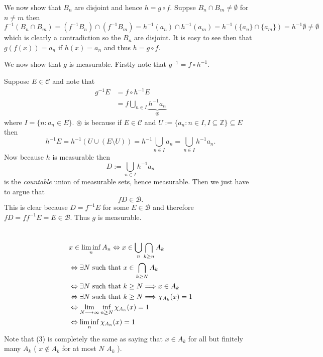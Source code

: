 \documentclass{unswmaths}
\begin{document}
We now show that $ B_n $ are disjoint and hence $ h = g \circ f $. Suppse $ B_n \cap B_m \neq \emptyset $ for $ n \neq m $ then 
$$ f^{-1} (B_n \cap B_m) = (f^{-1} B_n) \cap (f^{-1} B_m) = h^{-1}(a_n) \cap h^{-1}(a_m) = h^{-1}( \{a_n\} \cap \{a_m\} ) = h^{-1} \emptyset \neq \emptyset $$
which is clearly a contradiction so the $ B_n $ are disjoint. It is easy to see then that $ g(f(x)) = a_n $ if $ h(x) = a_n $ and thus $ h = g \circ f $.

We now show that $ g $ is measurable. Firstly note that $ g^{-1} = f \circ h^{-1} $.

Suppose $ E \in \mathcal{C} $ and note that
\begin{align*}
g^{-1}E &= f \circ h^{-1} E \\
&= f \bigcup_{n \in I} \underbrace{h^{-1} a_n}_{\circledast}
\end{align*}
where $ I = \{ n : a_n \in E \} $.
$ \circledast $ is because if $ E \in \mathcal{C} $ and $ U := \{ a_n : n \in I, I \subseteq \mathbb{Z} \} \subseteq E $ then
$$ h^{-1} E = h^{-1} \left(U \cup \left(E \setminus U \right)\right) = h^{-1} \bigcup_{n\in I} a_n = \bigcup_{n \in I} h^{-1} a_n. $$
Now because $ h $ is measurable then
$$
D := \bigcup_{n \in I} h^{-1}a_n
$$
is the \emph{countable} union of measurable sets, hence measurable.
Then we just have to argue that
$$
fD \in \mathcal{B}.
$$
This is clear because $ D = f^{-1} E $ for some $ E \in \mathcal{B} $ and therefore $ fD = ff^{-1}E = E \in \mathcal{B} $.
Thus $ g $ is measurable.
\section{}
\subsection{}
\begin{align}
    & x \in \liminf_n A_n \Leftrightarrow x \in \bigcup_n \bigcap_{k\geq n} A_k \\
    & \Leftrightarrow \exists N \text{ such that } x \in \bigcap_{k\geq N} A_k \\
    & \Leftrightarrow \exists N \text{ such that } k \geq N \Longrightarrow x \in A_k \\
    & \Leftrightarrow \exists N \text{ such that } k \geq N \Longrightarrow \chi_{A_k}(x) = 1 \\
    & \Leftrightarrow \lim_{N \longrightarrow \infty} \inf_{n \geq N} \chi_{A_n}(x) = 1 \\
    & \Leftrightarrow \liminf_{n} \chi_{A_n}(x) = 1
\end{align}
Note that (3) is completely the same as saying that $ x \in A_k $ for all but finitely many $ A_k $ ( $ x \not\in A_k $ for at most $ N $ $ A_k $ ).
\end{document}
